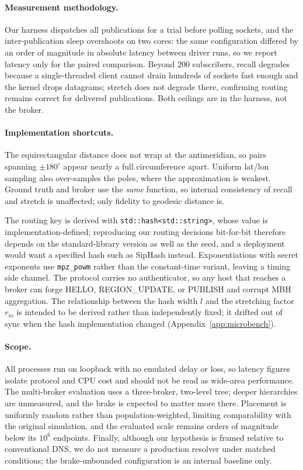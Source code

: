 \documentclass[10pt]{article}
\begin{document}
\paragraph{Measurement methodology.} Our harness dispatches all publications for a trial before polling sockets, and the inter-publication sleep overshoots on two cores: the same configuration differed by an order of magnitude in absolute latency between driver runs, so we report latency only for the paired comparison. Beyond 200 subscribers, recall degrades because a single-threaded client cannot drain hundreds of sockets fast enough and the kernel drops datagrams; stretch does not degrade there, confirming routing remains correct for delivered publications. Both ceilings are in the harness, not the broker.

\paragraph{Implementation shortcuts.} The equirectangular distance does not wrap at the antimeridian, so pairs spanning $\pm 180^\circ$ appear nearly a full circumference apart. Uniform lat/lon sampling also over-samples the poles, where the approximation is weakest. Ground truth and broker use the \emph{same} function, so internal consistency of recall and stretch is unaffected; only fidelity to geodesic distance is.

The routing key is derived with \texttt{std::hash<std::string>}, whose value is implementation-defined; reproducing our routing decisions bit-for-bit therefore depends on the standard-library version as well as the seed, and a deployment would want a specified hash such as SipHash instead. Exponentiations with secret exponents use \texttt{mpz\_powm} rather than the constant-time variant, leaving a timing side channel. The protocol carries no authenticator, so any host that reaches a broker can forge HELLO, REGION\_UPDATE, or PUBLISH and corrupt MBH aggregation. The relationship between the hash width $l$ and the stretching factor $r_m$ is intended to be derived rather than independently fixed; it drifted out of sync when the hash implementation changed (Appendix~\ref{app:microbench}).

\paragraph{Scope.} All processes run on loopback with no emulated delay or loss, so latency figures isolate protocol and CPU cost and should not be read as wide-area performance. The multi-broker evaluation uses a three-broker, two-level tree; deeper hierarchies are unmeasured, and the brake is expected to matter more there. Placement is uniformly random rather than population-weighted, limiting comparability with the original simulation, and the evaluated scale remains orders of magnitude below its $10^6$ endpoints. Finally, although our hypothesis is framed relative to conventional DNS, we do not measure a production resolver under matched conditions; the brake-unbounded configuration is an internal baseline only.
\end{document}
